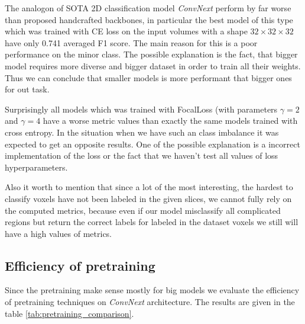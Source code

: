 \documentclass[twocolumn, a4paper]{article}
\theoremstyle{definition}
\begin{document}
The analogon of SOTA 2D classification model \textit{ConvNext} perform by far worse than proposed handcrafted backbones, in particular the
best model of this type which was trained with CE loss on the input volumes with a shape \( 32 \times 32 \times 32 \) have only
0.741 averaged F1 score. The main reason for this is a poor performance on the minor class. The possible explanation is the fact, that
bigger model requires more diverse and bigger dataset in order to train all their weights. Thus we can conclude that smaller models
is more performant that bigger ones for out task.

Surprisingly all models which was trained with FocalLoss (with parameters \( \gamma = 2 \) and \( \gamma=4 \) have a worse metric values than exactly the same models trained with
cross entropy. In the situation when we have such an class imbalance it was expected to get an opposite results. One of the possible
explanation is a incorrect implementation of the loss or the fact that we haven't test all values of loss hyperparameters.

Also it worth to mention that since a lot of the most interesting, the hardest to classify voxels have not been labeled in the given slices,
we cannot fully rely on the computed metrics, because even if our model misclassify all complicated regions but return the correct labels for
labeled in the dataset voxels we still will have a high values of metrics.


\subsection{Efficiency of pretraining}

Since the pretraining make sense mostly for big models we evaluate the efficiency of pretraining techniques
on \textit{ConvNext} architecture. The results are given in the table \ref{tab:pretraining_comparison}.
\end{document}
